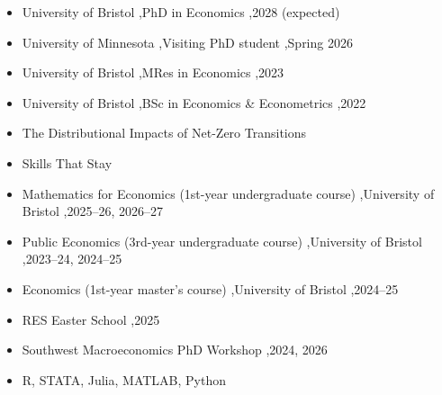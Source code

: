 \documentclass[letterpaper,11pt]{article}
\begin{document}


\begin{itemize}
\item University of Bristol \sep PhD in Economics \sep 2028 (expected)
\item University of Minnesota \sep Visiting PhD student \sep Spring 2026
\item University of Bristol \sep MRes in Economics \sep 2023
\item University of Bristol \sep BSc in Economics \& Econometrics \sep 2022
\end{itemize}


\begin{itemize}
    \item The Distributional Impacts of Net-Zero Transitions 
\end{itemize}

\begin{itemize}
    \item Skills That Stay
\end{itemize}


\begin{itemize}
\item Mathematics for Economics (1st-year undergraduate course) \sep University of Bristol \sep 2025--26, 2026--27
\item Public Economics (3rd-year undergraduate course) \sep University of Bristol \sep 2023--24, 2024--25
\item Economics (1st-year master's course) \sep University of Bristol \sep 2024--25
\end{itemize}


\begin{itemize}
\item RES Easter School \sep 2025
\item Southwest Macroeconomics PhD Workshop \sep 2024, 2026
\end{itemize}


\begin{itemize}
\item R, STATA, Julia, MATLAB, Python
\end{itemize}
\end{document}
